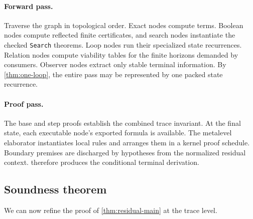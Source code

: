 \paragraph{Forward pass.}
Traverse the graph in topological order.  Exact nodes compute terms.  Boolean nodes compute reflected finite certificates, and search nodes instantiate the checked \texttt{Search} theorems.  Loop nodes run their specialized state recurrences.  Relation nodes compute viability tables for the finite horizons demanded by consumers.  Observer nodes extract only stable terminal information.  By \cref{thm:one-loop}, the entire pass may be represented by one packed state recurrence.

\paragraph{Proof pass.}
The base and step proofs establish the combined trace invariant.  At the final state, each executable node's exported formula is available.  The metalevel elaborator instantiates local rules and arranges them in a kernel proof schedule.  Boundary premises are discharged by hypotheses from the normalized residual context.   therefore produces the conditional terminal derivation.

\subsection{Soundness theorem}

We can now refine the proof of \cref{thm:residual-main} at the trace level.

